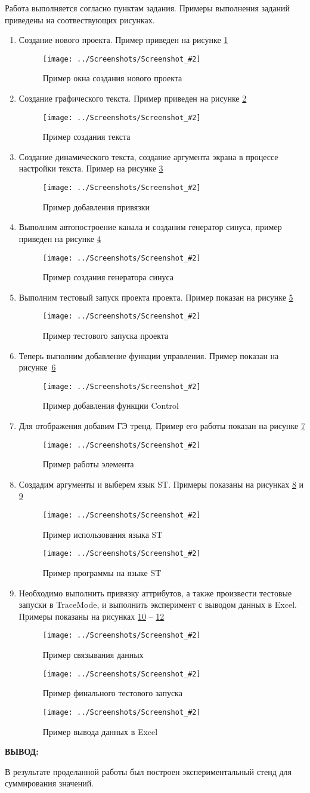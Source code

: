 \documentclass[14pt,a4paper]{extreport}
\newcommand{\sshot}[2]{\begin{figure}[ht]%
\centering\texttt{[image: ../Screenshots/Screenshot\_\#2]}%
\caption{#1}%
\label{sshot#2}%
\end{figure}%
}
\newcommand{\header}[1]{%
{
\clearpage%
\fontsize{16pt}{14pt}\selectfont
\begin{center}
\textbf{\MakeUppercase{#1}:}
\end{center}
}
}
\begin{document}
Работа выполняется согласно пунктам задания. Примеры выполнения заданий приведены на соотвествующих рисунках.

\begin{enumerate}

\item Создание нового проекта. Пример приведен на рисунке \ref{sshot1}

\sshot{Пример окна создания нового проекта}{1}

\item Создание графического текста. Пример приведен на рисунке \ref{sshot2}

\sshot{Пример создания текста}{2}

\item Создание динамического текста, создание аргумента экрана в процессе настройки текста. Пример на рисунке \ref{sshot3}

\sshot{Пример добавления привязки}{3}

\item Выполним автопостроение канала и созданим генератор синуса, пример приведен на рисунке \ref{sshot4}

\sshot{Пример создания генератора синуса}{4}

\item Выполним тестовый запуск проекта проекта. Пример показан на рисунке  \ref{sshot5}

\sshot{Пример тестового запуска проекта}{5}

\item Теперь выполним добавление функции управления. Пример показан на рисунке~\ref{sshot6}

\sshot{Пример добавления функции Control}{6}

\item Для отображения добавим ГЭ тренд. Пример его работы показан на рисунке \ref{sshot7}

\clearpage

\sshot{Пример работы элемента}{7}

\item Создадим аргументы и выберем язык ST. Примеры показаны на рисунках \ref{sshot8} и \ref{sshot9}

\sshot{Пример использования языка ST}{8}

\sshot{Пример программы на языке ST}{9}

\clearpage

\item Необходимо выполнить привязку аттрибутов, а также произвести тестовые запуски в TraceMode, и выполнить эксперимент с выводом данных в Excel. Примеры показаны на рисунках \ref{sshot10} -- \ref{sshot12}

\sshot{Пример связывания данных}{10}
\sshot{Пример финального тестового запуска}{11}
\sshot{Пример вывода данных в Excel}{12}

\end{enumerate}

\header{Вывод}


В результате проделанной работы был построен экспериментальный стенд для суммирования значений.
\end{document}
